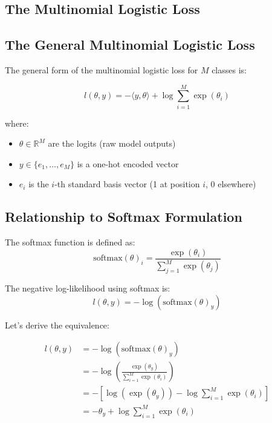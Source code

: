 \begin{notechapter}
\chapter{The Multinomial Logistic Loss}\label{ch:multinomial-logistic-loss}

\section{The General Multinomial Logistic Loss}

The general form of the multinomial logistic loss for $M$ classes is:

\begin{equation}
l(\theta, y) = -\langle y, \theta\rangle + \log \sum_{i=1}^{M} \exp(\theta_i)
\end{equation}

where:
\begin{itemize}
    \item $\theta \in \mathbb{R}^M$ are the logits (raw model outputs)
    \item $y \in \{e_1, \ldots, e_M\}$ is a one-hot encoded vector
    \item $e_i$ is the $i$-th standard basis vector (1 at position $i$, 0 elsewhere)
\end{itemize}

\section{Relationship to Softmax Formulation}

The softmax function is defined as:
\[
\text{softmax}(\theta)_i = \frac{\exp(\theta_i)}{\sum_{j=1}^{M} \exp(\theta_j)}
\]

The negative log-likelihood using softmax is:
\[
l(\theta, y) = -\log(\text{softmax}(\theta)_y)
\]

Let's derive the equivalence:

\begin{align*}
l(\theta, y) &= -\log(\text{softmax}(\theta)_y) \\
&= -\log\left(\frac{\exp(\theta_y)}{\sum_{i=1}^{M} \exp(\theta_i)}\right) \\
&= -\left[\log(\exp(\theta_y)) - \log\sum_{i=1}^{M} \exp(\theta_i)\right] \\
&= -\theta_y + \log\sum_{i=1}^{M} \exp(\theta_i)
\end{align*}


\end{notechapter}
